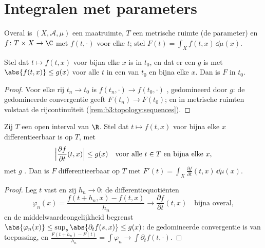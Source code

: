 \section{Integralen met parameters}

Overal is $(X, \mathcal A, \mu)$ een maatruimte, $T$ een metrische
ruimte (de parameter) en $f \colon T \times X \to \C$ met $f(t,
\cdot)$  voor elke $t$; stel $F(t) = \int_X f(t,
x)\,\dd\mu(x)$.

\begin{theorem}[Continuïteit]\label{thm:b3:lebesgue:paramcont}
Stel dat $t \mapsto f(t,x)$ voor bijna elke $x$  is in
$t_0$, en dat er een  $g$ is met $\abs{f(t,x)} \leq
g(x)$ voor alle $t$ in een  van $t_0$ en bijna elke $x$.
Dan is $F$  in $t_0$.
\end{theorem}

\begin{proof}
Voor elke rij $t_n \to t_0$ is $f(t_n, \cdot) \to f(t_0, \cdot)$
, gedomineerd door $g$: de gedomineerde convergentie
geeft $F(t_n) \to F(t_0)$; en in metrische ruimten volstaat de
rijcontinuïteit (\cref{rem:b3:topology:sequences}).
\end{proof}

\begin{theorem}
\label{thm:b3:lebesgue:paramdiff}
Zij $T$ een open interval van $\R$. Stel dat $t \mapsto f(t,x)$
voor bijna elke $x$ differentieerbaar is op $T$, met
\[
\Bigl|\frac{\partial f}{\partial t}(t, x)\Bigr| \leq g(x)
\quad \text{voor alle } t \in T \text{ en bijna elke } x,
\]
met $g$ . Dan is $F$ differentieerbaar op $T$ met
$F'(t) = \int_X \frac{\partial f}{\partial t}(t, x)\,\dd\mu(x)$.
\end{theorem}

\begin{proof}
Leg $t$ vast en zij $h_n \to 0$: de differentiequotiënten
\[
\varphi_n(x) = \frac{f(t + h_n, x) - f(t, x)}{h_n}
\longrightarrow \frac{\partial f}{\partial t}(t,x)
\quad\text{bijna overal},
\]
en de middelwaardeongelijkheid begrenst $\abs{\varphi_n(x)} \leq
\sup_{s}\abs{\partial_tf(s,x)} \leq g(x)$: de gedomineerde
convergentie is van toepassing, en $\frac{F(t + h_n) - F(t)}{h_n}
= \int\varphi_n \to \int\partial_t f(t, \cdot)$.
\end{proof}

